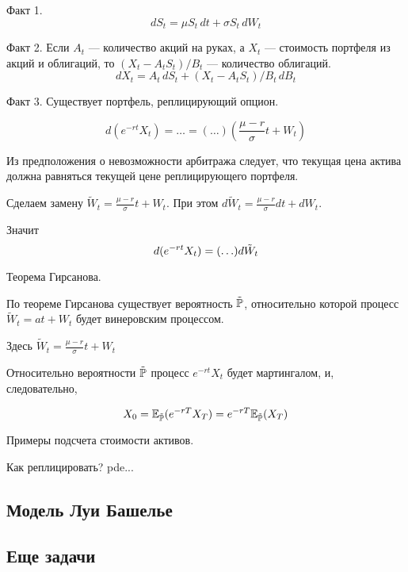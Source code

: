 {Факт 1.
\[
dS_t=\mu S_t \, dt + \sigma S_t \, dW_t
\]

Факт 2. Если $A_t$ --- количество акций на руках, а $X_t$ --- стоимость портфеля из акций и облигаций, то $(X_t - A_t S_t)/B_t$ --- количество облигаций.
\[
dX_t = A_t \, dS_t + (X_t - A_t S_t)/B_t \, dB_t
\]

Факт 3. Существует портфель, реплицирующий опцион.

\[
d(e^{-rt}X_t)= \ldots = (\ldots) \left( \frac{\mu - r}{\sigma } t + W_t  \right)
\]

Из предположения о невозможности арбитража следует, что текущая цена актива должна равняться текущей цене реплицирующего портфеля.

Сделаем замену $\tilde{W}_t=\frac{\mu - r}{\sigma } t + W_t$. При этом $d\tilde{W}_t = \frac{\mu - r}{\sigma } dt + dW_t$.

Значит
\[
d(e^{-rt}X_t)= (\ldots) d\tilde{W}_t
\]


Теорема Гирсанова.

По теореме Гирсанова существует вероятность $\tilde{\mathbb{P}}$, относительно которой процесс $\tilde{W}_t=at + W_t$ будет винеровским процессом.

Здесь $\tilde{W}_t=\frac{\mu-r}{\sigma}t + W_t$


Относительно вероятности $\tilde{\mathbb{P}}$ процесс $e^{-rt}X_t$ будет мартингалом, и, следовательно,

\[
X_0=\mathbb{E}_{\tilde{\mathbb{P}}}(e^{-rT}X_T)=e^{-rT}\mathbb{E}_{\tilde{\mathbb{P}}}(X_T)
\]


Примеры подсчета стоимости активов.

Как реплицировать? pde...

}\subsection{Модель Луи Башелье} \subsection{Еще задачи}






